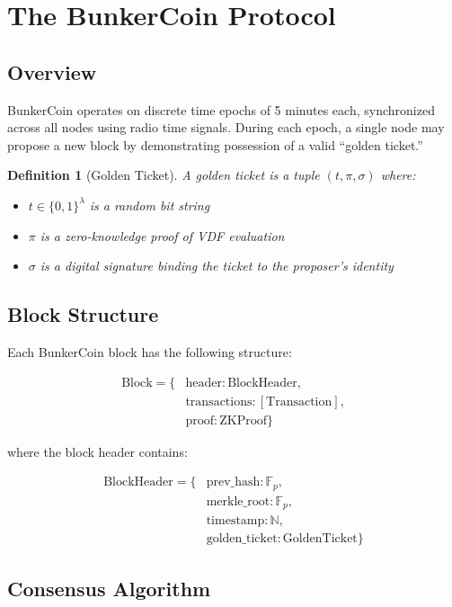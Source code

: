 \documentclass[11pt,a4paper]{article}
\newtheorem{definition}[theorem]{Definition}
\begin{document}
\section{The BunkerCoin Protocol}

\subsection{Overview}

BunkerCoin operates on discrete time epochs of 5 minutes each, synchronized across all nodes using radio time signals. During each epoch, a single node may propose a new block by demonstrating possession of a valid ``golden ticket.''

\begin{definition}[Golden Ticket]
A golden ticket is a tuple $(t, \pi, \sigma)$ where:
\begin{itemize}
\item $t \in \{0,1\}^{\lambda}$ is a random bit string
\item $\pi$ is a zero-knowledge proof of VDF evaluation
\item $\sigma$ is a digital signature binding the ticket to the proposer's identity
\end{itemize}
\end{definition}

\subsection{Block Structure}

Each BunkerCoin block has the following structure:

\begin{align}
\text{Block} = \{&\text{header}: \text{BlockHeader},\\
&\text{transactions}: [\text{Transaction}],\\
&\text{proof}: \text{ZKProof}\}
\end{align}

where the block header contains:

\begin{align}
\text{BlockHeader} = \{&\text{prev\_hash}: \mathbb{F}_p,\\
&\text{merkle\_root}: \mathbb{F}_p,\\
&\text{timestamp}: \mathbb{N},\\
&\text{golden\_ticket}: \text{GoldenTicket}\}
\end{align}

\subsection{Consensus Algorithm}
\end{document}
